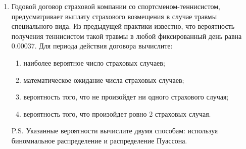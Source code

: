 \begin{enumerate}



\item Годовой договор страховой компании со спортсменом-теннисистом, предусматривает
выплату страхового возмещения  в случае травмы специального вида. Из предыдущей
практики известно, что вероятность получения теннисистом такой травмы  в любой
фиксированный день равна $0.00037$. Для периода действия договора вычислите:
\begin{enumerate}
\item наиболее вероятное число страховых случаев;
\item математическое ожидание числа страховых случаев;
\item вероятность того, что не произойдет ни одного страхового случая;
\item вероятность того, что произойдет ровно 2 страховых случая.
\end{enumerate}
P.S. Указанные вероятности вычислите двумя способам: используя биномиальное распределение
и распределение Пуассона.


\end{enumerate}
